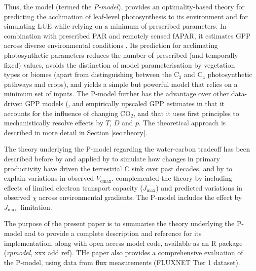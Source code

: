 \documentclass{myreport}
\newcommand{\vcmax}{$V_{\text{cmax}}$}
\newcommand{\jmax}{$J_{\text{max}}$}
\begin{document}
Thus, the model (termed the \textit{P-model}), provides an optimality-based theory for predicting the acclimation of leaf-level photosynthesis to its environment and for simulating LUE while relying on a minimum of prescribed parameters. In combination with prescribed PAR and remotely sensed fAPAR, it estimates GPP across diverse environmental conditions \citep{wang17natpl}. Its prediction for acclimating photosynthetic parameters reduces the number of prescribed (and temporally fixed) values, avoids the distinction of model parameterisation by vegetation types or biomes (apart from distinguishing between the C$_3$ and C$_4$ photosynthetic pathways and crops), and yields a simple but powerful model that relies on a minimum set of inputs. The P-model further has the advantage over other data-driven GPP models (\citep{running04, Zhang2017-yr}, and empirically upscaled GPP estimates \citep{jung11jgr} in that it accounts for the influence of changing CO$_2$, and that it uses first principles to mechanistically resolve effects by $T$, $D$ and $p$. The theoretical approach is described in more detail in Section \ref{sec:theory}.

The theory underlying the P-model regarding the water-carbon tradeoff has been described before by \citet{prentice14ecollett} and applied by \citet{keenan17natcomm} to simulate how changes in primary productivity have driven the terrestrial C sink over past decades, and by \citet{smith19ecollett} to explain variations in observed \vcmax .  \citet{wang17natpl} complemented the theory by including effects of limited electron transport capacity (\jmax ) and predicted variations in observed $\chi$ across environmental gradients. The P-model includes the effect by \jmax\ limitation.

The purpose of the present paper is to summarise the theory underlying the P-model and to provide a complete description and reference for its implementation, along with open access model code, available as an R package (\textit{rpmodel}, xxx add ref). THe paper also provides a comprehensive evaluation of the P-model, using data from flux measurements (FLUXNET Tier 1 dataset). %
\end{document}
